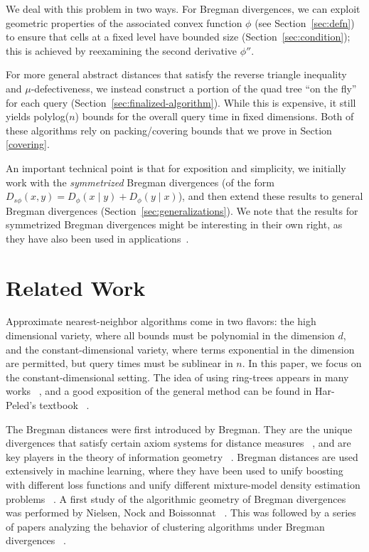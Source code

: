 \documentclass[11pt]{myclass}
\newcommand{\breg}{\ensuremath{D_\phi}}
\newcommand{\sbreg}{\ensuremath{D_{s\phi}}}
\begin{document}
We deal with this problem in two ways. For Bregman divergences, we can exploit geometric properties of the 
associated convex function $\phi$ (see Section~\ref{sec:defn}) to ensure that cells at a fixed level have bounded
size (Section~\ref{sec:condition}); this is achieved by reexamining the second derivative $\phi''$. 

For more general abstract distances that satisfy the reverse triangle inequality and $\mu$-defectiveness,
 we instead construct a portion of the quad tree ``on the fly'' for each query (Section~\ref{sec:finalized-algorithm}).
 While this is expensive, it still yields polylog($n$) bounds for the overall query time in fixed dimensions. 
Both of these algorithms rely on packing/covering bounds that we prove in Section \ref{covering}. 

An important technical point is that for exposition and simplicity, we initially work with 
the \emph{symmetrized} Bregman divergences (of the form $\sbreg(x,y) = \breg(x \mid y) + \breg(y \mid x)$), 
and then  extend these results to general Bregman divergences (Section~\ref{sec:generalizations}).
 We note that the results for symmetrized Bregman divergences might be interesting in their own right, 
as they have also been used in applications~\cite{vptrees,tailoredbregmannn,symmetrizedcentroids,moresymmetrizedcentroids}.



 

\section{Related Work}
\label{sec:related}


Approximate nearest-neighbor algorithms come in two flavors: the high dimensional variety, where all bounds must be polynomial in the dimension $d$, and the constant-dimensional variety, where terms exponential in the dimension are permitted, but query times must be sublinear in $n$. In this paper, we focus on the constant-dimensional setting. The idea of using ring-trees appears in many works ~\cite{indykmotwani,blackbox,peledmendel}, and a good exposition of the general method can be found in Har-Peled's textbook ~\cite[Chapter 11]{snotes}. 

The Bregman distances were first introduced by Bregman\cite{bregman}. They are the unique divergences that satisfy certain axiom systems for distance measures ~\cite{csiszar}, and are key players in the theory of information geometry ~\cite{amari}. Bregman distances are used extensively in machine learning, where they have been used to unify boosting with different loss functions\cite{collins2002logistic} and unify different mixture-model density estimation problems ~\cite{dhillon}. A first study of the algorithmic geometry of Bregman divergences was performed by Nielsen, Nock and Boissonnat ~\cite{bvd}. This was followed by a series of papers analyzing the behavior of clustering algorithms under Bregman divergences ~\cite{musimilarcoresets,ackermann2, ackermann3,roglin1,mcgregor}. 
\end{document}
